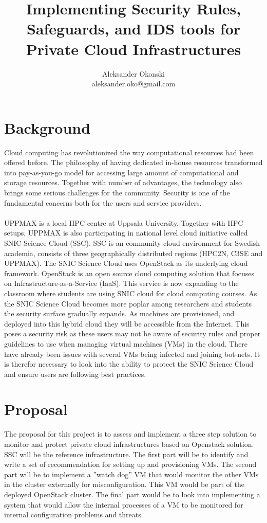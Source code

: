 \documentclass[12pt]{article}
\title{Implementing Security Rules, Safeguards, and IDS tools for Private Cloud Infrastructures}
\author{Aleksander Okonski \\ aleksander.oko@gmail.com}
\date{}
\begin{document}
\maketitle

\section{Background}
Cloud computing has revolutionized the way computational resources had been offered before. The philosophy of having dedicated in-house resources transformed into pay-as-you-go model for accessing large amount of computational and storage resources. Together with number of advantages, the technology also brings some serious challenges for the community. Security is one of the fundamental concerns both for the users and service providers.
\\
\\
UPPMAX is a local HPC centre at Uppsala University. Together with HPC setups, UPPMAX is also participating in national level cloud initiative called SNIC Science Cloud (SSC). SSC is an community cloud environment for Swedish academia, consists of three geographically distributed regions (HPC2N, C3SE and UPPMAX). The SNIC Science Cloud uses OpenStack as its underlying cloud framework. OpenStack is an open source cloud computing solution that focuses on Infrastructure-as-a-Service (IaaS). This service is now expanding to the classroom where students are using SNIC cloud for cloud computing courses. As the SNIC Science Cloud becomes more poplar among researchers and students the security surface gradually expands. As machines are provisioned, and deployed into this hybrid cloud they will be accessible from the Internet. This poses a security risk as these users may not be aware of security rules and proper guidelines to use when managing virtual machines (VMs) in the cloud. There have already been issues with several VMs being infected and joining bot-nets. It is therefor necessary to look into the ability to protect the SNIC Science Cloud and ensure users are following best practices.

\section{Proposal}
The proposal for this project is to assess and implement a three step solution to monitor and protect private cloud infrastructures based on Openstack solution. SSC will be the reference infrastructure. The first part will be to identify and write a set of recommendation for setting up and provisioning VMs. The second part will be to implement a ”watch dog” VM that would monitor the other VMs in the cluster externally for misconfiguration. This VM would be part of the deployed OpenStack cluster. The final part would be to look into implementing a system that would allow the internal processes of a VM to be monitored for internal configuration problems and threats.
\end{document}
